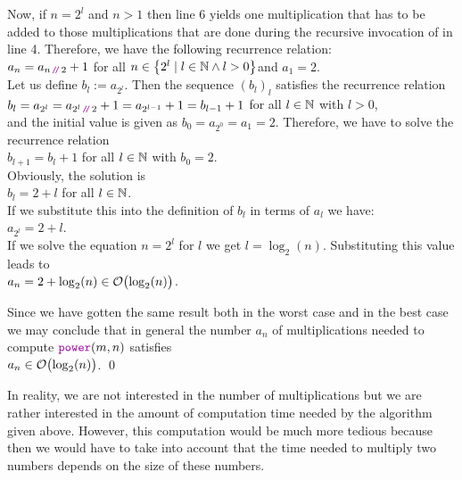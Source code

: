 Now, if $n = 2^l$ and $n > 1$ then line 6 yields one multiplication that 
has to be added to those multiplications that are done during the recursive invocation of
 in line 4.  Therefore, we have the following recurrence relation:
 \\[0.2cm]
\hspace*{1.3cm} $a_n = a_{n \dvv 2} + 1$ \qquad for all $n \in \left\{2^l \mid l \in {\mathbb N} \wedge l > 0\right\}$\quad and
$a_1 = 2$. 
\\[0.2cm]
Let us define $b_l := a_{2^l}$.  Then the sequence $(b_l)_l$ satisfies the recurrence relation
 \\[0.2cm]
\hspace*{1.3cm} 
$b_l = a_{2^l} = a_{2^l \dvv 2} + 1 = a_{2^{l-1}} + 1 = b_{l-1} + 1$ \qquad for all $l\in{\mathbb N}$ with $l > 0$, \\[0.2cm]
and the initial value is given as $b_0 = a_{2^0} = a_1 = 2$.
Therefore, we have to solve the recurrence relation 
\\[0.2cm]
\hspace*{1.3cm}
 $b_{l+1} = b_l + 1$ \qquad for all $l \in {\mathbb N}$ \quad with $b_0 = 2$.\\[0.2cm]
Obviously, the solution is \\[0.2cm]
\hspace*{1.3cm} $b_l = 2 + l$ \qquad for all $l\in{\mathbb N}$.
\\[0.2cm]
If we substitute this into the definition of $b_l$ in terms of $a_l$ we have: \\[0.2cm]
\hspace*{1.3cm}
$a_{2^l} = 2 + l$. 
\\[0.2cm]
If we solve the equation $n = 2^l$ for  $l$ we get $l =
\log_2(n)$. Substituting this value leads to
\\[0.2cm]
\hspace*{1.3cm}
 $a_n = 2 + \log_2(n) \in \mathcal{O}\bigl(\log_2(n)\bigr)$.
\vspace*{0.3cm}

Since we have gotten the same result both in the worst case and in the best case we may conclude
that in general the number $a_n$ of multiplications needed to compute $\mytt{power}(m, n)$ satisfies 
\\[0.2cm]
\hspace*{1.3cm} 
$a_n \in \mathcal{O}\bigl(\log_2(n)\bigr)$. \qed

\remark
In reality, we are not interested in the number of multiplications but we are rather interested
in the amount of computation time needed by the algorithm given above.
However, this computation would be much more tedious because then we would have to take into account
that the time needed to multiply two numbers depends on the size of these numbers.

